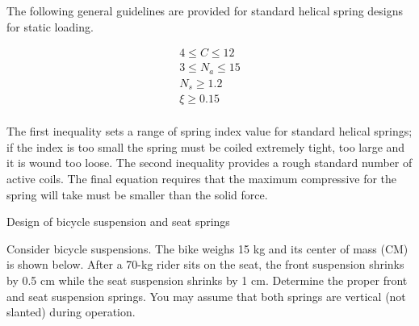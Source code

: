 \documentclass[
10pt,
a4paper,
openany,
svgnames,
]{book}
\begin{document}
The following general guidelines are provided for standard helical spring designs for static loading.

\begin{equation}
  \begin{gathered}
    4 \leqslant C \leqslant 12 \\ 
    3 \leqslant N_a \leqslant 15 \\ 
    N_s \geqslant 1.2 \\ 
    \xi  \geqslant 0.15 \\ 
  \end{gathered}
\end{equation}

The first inequality sets a range of spring index value for standard helical springs; if the index is too small the spring must be coiled extremely tight, too large and it is wound too loose. The second inequality provides a rough standard number of active coils. The final equation requires that the maximum compressive for the spring will take must be smaller than the solid force.

\begin{example} Design of bicycle suspension and seat springs

  Consider bicycle suspensions. The bike weighs 15 kg and its center of mass (CM) is shown below. After a 70-kg rider sits on the seat, the front suspension shrinks by 0.5 cm while the seat suspension shrinks by 1 cm. Determine the proper front and seat suspension springs. You may assume that both springs are vertical (not slanted) during operation.

\end{example}
\end{document}
